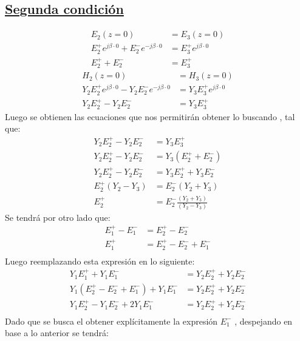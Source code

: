 \documentclass[
  11pt,
  letterpaper,
   addpoints,
   answers
  ]{exam}
\begin{document}
\begin{questions}
\begin{solution}
\begin{itemize}
\subsection*{\underline{Segunda condición}}
\begin{align}
    E_{2}(z=0) &= E_{3}(z=0)\\
    E_{2}^{+}e^{j\beta \cdot 0} +E_{2}^{-}e^{-j\beta \cdot 0} &= E_{3}^{+}e^{j\beta \cdot 0}\\
    E_{2}^{+} + E_{2}^{-} &= E_{3}^{+}
\end{align}
\begin{align}
    H_{2}(z=0) &= H_{3}(z=0)\\
    Y_{2}E_{2}^{+}e^{j\beta \cdot 0} - Y_{2}E_{2}^{-}e^{-j\beta \cdot 0} &= Y_{3} E_{3}^{+}e^{j\beta \cdot 0}\\
    Y_{2}E_{2}^{+} - Y_{2}E_{2}^{-} &= Y_{3}E_{3}^{+}
\end{align}
Luego se obtienen las ecuaciones que nos permitirán obtener lo buscando , tal que:
\begin{align}
    Y_{2}E_{2}^{+} - Y_{2}E_{2}^{-} &= Y_{3}E_{3}^{+}\\
    Y_{2}E_{2}^{+} - Y_{2}E_{2}^{-} &= Y_{3}(E_{2}^{+}+E_{2}^{-})\\
    Y_{2}E_{2}^{+} - Y_{2}E_{2}^{-} &= Y_{3}E_{2}^{+}+ Y_{3}E_{2}^{-}\\
    E_{2}^{+}(Y_{2} - Y_{3}) &= E_{2}^{-}(Y_{2}+Y_{3})\\
    E_{2}^{+} &= E_{2}^{-}\frac{(Y_{2} + Y_{3})}{(Y_{2}-Y_{3})} 
\end{align}
Se tendrá por otro lado que:
\begin{align}
    E_{1}^{+} -E_{1}^{-} &= E_{2}^{+}- E_{2}^{-}\\
                      E_{1}^{+}   &= E_{2}^{+}- E_{2}^{-}+ E_{1}^{-}\\ 
\end{align}
Luego reemplazando esta expresión en lo siguiente:
\begin{align}
    Y_{1}E_{1}^{+} + Y_{1}E_{1}^{-} &= Y_{2}E_{2}^{+}+ Y_{2}E_{2}^{-}\\
    Y_{1}(E_{2}^{+}- E_{2}^{-}+ E_{1}^{-})+ Y_{1}E_{1}^{-} &= Y_{2}E_{2}^{+}+ Y_{2}E_{2}^{-}\\
    Y_{1}E_{2}^{+} - Y_{1}E_{2}^{-} + 2Y_{1}E_{1}^{-} &= Y_{2}E_{2}^{+} + Y_{2}E_{2}^{-}\\
\end{align}
Dado que se busca el obtener explícitamente la expresión $E_{1}^{-}$ , despejando en base a lo anterior se tendrá:
\begin{align}

\end{align}
\end{itemize}
\end{solution}
\end{questions}
\end{document}
